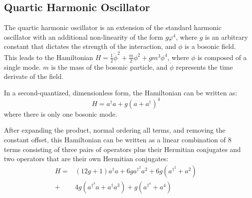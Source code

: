 \subsection{Quartic Harmonic Oscillator}
\label{sec:qosc_results}

The quartic harmonic oscillator \cite{PhysRev.184.1231, girguś2024spiralflowquantumquartic, wójcik2012applicationnumericalrenormalizationgroup} is an extension of the standard harmonic oscillator with an additional non-linearity of the form $g \varphi^4$, where $g$ is an arbitrary constant that dictates the strength of the interaction, and $\phi$ is a bosonic field.
This leads to the Hamiltonian $H = \frac12\dot\phi^2 + \frac{m}{2}\phi^2 + gm^3\phi^4 $, where $\phi$ is composed of a single mode.
$m$ is the mass of the bosonic particle, and $\dot \phi$ represents the time derivate of the field.

In a second-quantized, dimensionless form, the Hamiltonian can be written as:
\begin{equation}
    \label{eq:qosc}
    H = a^\dagger a + g\left(a + a^\dagger \right)^4
\end{equation}
where there is only one bosonic mode.

After expanding the product, normal ordering all terms, and removing the constant offset, this Hamiltonian can be written as a linear combination of $8$ terms consisting of three pairs of operators plus their Hermitian conjugates and two operators that are their own Hermitian conjugates:
\begin{equation}
    \begin{split}
        H = &(12g + 1) a^\dagger a + 6g a^{\dagger^2} a^2 + 6g \left(a^{\dagger^2} + a^2 \right) \\
        + &4g \left(a^{\dagger^3} a + a^\dagger a^3 \right) + g \left(a^{\dagger^4} + a^4 \right)
    \end{split}
\end{equation}

